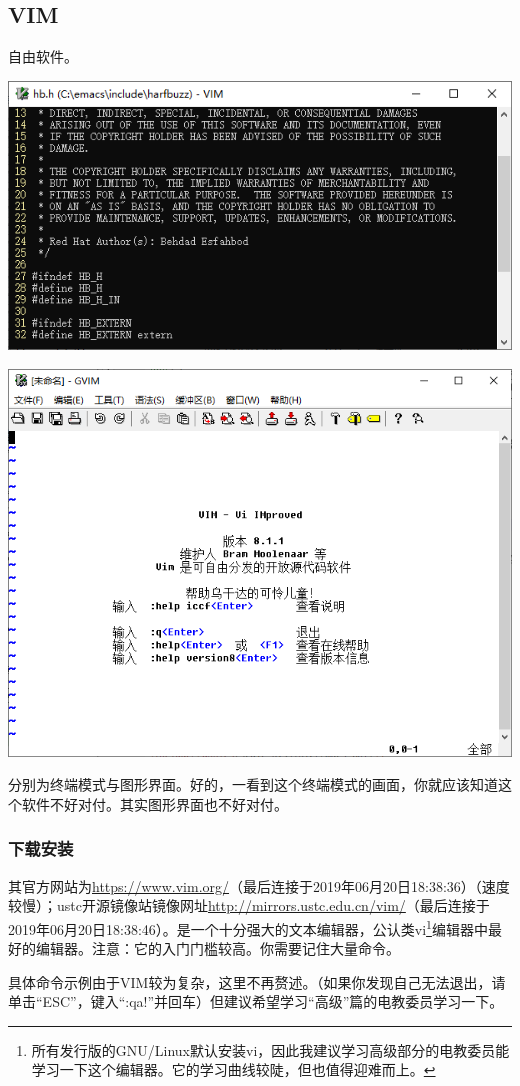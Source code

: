 \subsection{VIM}
自由软件。
\begin{center}
	\includegraphics[scale=0.7]{pic/vim.png}\par   \includegraphics[scale=0.7]{pic/gvim.png}
\end{center} \par
分别为终端模式与图形界面。好的，一看到这个终端模式的画面，你就应该知道这个软件不好对付。其实图形界面也不好对付。
\subsubsection{下载安装}
其官方网站为\url{https://www.vim.org/}（最后连接于2019年06月20日18:38:36）（速度较慢）；ustc开源镜像站镜像网址\url{http://mirrors.ustc.edu.cn/vim/}（最后连接于2019年06月20日18:38:46）。是一个十分强大的文本编辑器，公认类vi\footnote{所有发行版的GNU/Linux默认安装vi，因此我建议学习高级部分的电教委员能学习一下这个编辑器。它的学习曲线较陡，但也值得迎难而上。}编辑器中最好的编辑器。注意：它的入门门槛较高。你需要记住大量命令。\par
具体命令示例由于VIM较为复杂，这里不再赘述。（如果你发现自己无法退出，请单击“ESC”，键入“:qa!”并回车）但建议希望学习“高级”篇的电教委员学习一下。
